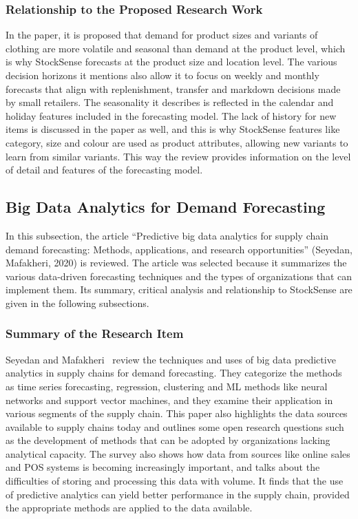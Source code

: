 \documentclass{StockSense}
\begin{document}
\subsubsection{Relationship to the Proposed Research Work}

In the paper, it is proposed that demand for product sizes and variants of clothing are more volatile and seasonal than demand at the product level, which is why StockSense forecasts at the product size and location level. The various decision horizons it mentions also allow it to focus on weekly and monthly forecasts that align with replenishment, transfer and markdown decisions made by small retailers. The seasonality it describes is reflected in the calendar and holiday features included in the forecasting model. The lack of history for new items is discussed in the paper as well, and this is why StockSense features like category, size and colour are used as product attributes, allowing new variants to learn from similar variants. This way the review provides information on the level of detail and features of the forecasting model.

\subsection{Big Data Analytics for Demand Forecasting}

In this subsection, the article ``Predictive big data analytics for supply chain demand forecasting: Methods, applications, and research opportunities'' (Seyedan, Mafakheri, 2020) is reviewed. The article was selected because it summarizes the various data-driven forecasting techniques and the types of organizations that can implement them. Its summary, critical analysis and relationship to StockSense are given in the following subsections.

\subsubsection{Summary of the Research Item}

Seyedan and Mafakheri~\cite{seyedan2020predictive} review the techniques and uses of big data predictive analytics in supply chains for demand forecasting. They categorize the methods as time series forecasting, regression, clustering and ML methods like neural networks and support vector machines, and they examine their application in various segments of the supply chain. This paper also highlights the data sources available to supply chains today and outlines some open research questions such as the development of methods that can be adopted by organizations lacking analytical capacity. The survey also shows how data from sources like online sales and POS systems is becoming increasingly important, and talks about the difficulties of storing and processing this data with volume. It finds that the use of predictive analytics can yield better performance in the supply chain, provided the appropriate methods are applied to the data available.
\end{document}
